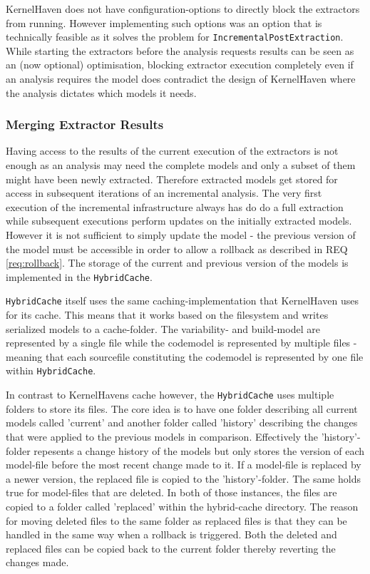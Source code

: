 \documentclass[a4paper]{article}
\begin{document}
KernelHaven does not have configuration-options to directly block the extractors from running. However implementing such options was an option that is technically feasible as it solves the problem for \texttt{IncrementalPostExtraction}. While starting the extractors before the analysis requests results can be seen as an (now optional) optimisation, blocking extractor execution completely even if an analysis requires the model does contradict the design of KernelHaven where the analysis dictates which models it needs.

\subsubsection{Merging Extractor Results}

Having access to the results of the current execution of the extractors is not enough as an analysis may need the complete models and only a subset of them might have been newly extracted. Therefore extracted models get stored for access in subsequent iterations of an incremental analysis. The very first execution of the incremental infrastructure always has do do a full extraction while subsequent executions perform updates on the initially extracted models. However it is not sufficient to simply update the model - the previous version of the model must be accessible in order to allow a rollback as described in REQ \ref{req:rollback}. The storage of the current and previous version of the models is implemented in the \texttt{HybridCache}.

\texttt{HybridCache} itself uses the same caching-implementation that KernelHaven uses for its cache. This means that it works based on the filesystem and writes serialized models to a cache-folder. The variability- and build-model are represented by a single file while the codemodel is represented by multiple files - meaning that each sourcefile constituting the codemodel is represented by one file within \texttt{HybridCache}.
 
 In contrast to KernelHavens cache however, the \texttt{HybridCache} uses multiple folders to store its files. The core idea is to have one folder describing all current models called 'current' and another folder called 'history' describing the changes that were applied to the previous models in comparison. Effectively the 'history'-folder repesents a change history of the models but only stores the version of each model-file before the most recent change made to it. 
 If a model-file is replaced by a newer version, the replaced file is copied to the 'history'-folder. The same holds true for model-files that are deleted. In both of those instances, the files are copied to a folder called 'replaced' within the hybrid-cache directory. The reason for moving deleted files to the same folder as replaced files is that they can be handled in the same way when a rollback is triggered. Both the deleted and replaced files can be copied back to the current folder thereby reverting the changes made.
 
\end{document}
